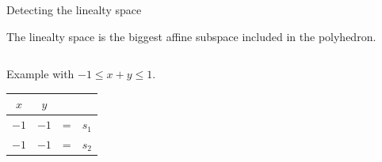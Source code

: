 \begin{frame}{Detecting the linealty space}

The linealty space is the biggest affine subspace included in the polyhedron.

\vspace*{0.2cm}

\begin{columns}[c]
\begin{column}{5cm}
Example with $-1\leq x+y\leq 1$.\\

\begin{tabular}{| c | c || c c |}
	\hline	
	$x$ & $y$ & & \\
	\hline
	\hline	
   	$-1$ & $-1$ & = & $s_1$\\ \hline	
   	$-1$ & $-1$ & = & $s_2$\\ \hline 
\end{tabular}

\vspace*{0.2cm}

\end{column}
\begin{column}{5cm}
\begin{figure}
\end{figure}
\end{column}
\end{columns}


\end{frame}

